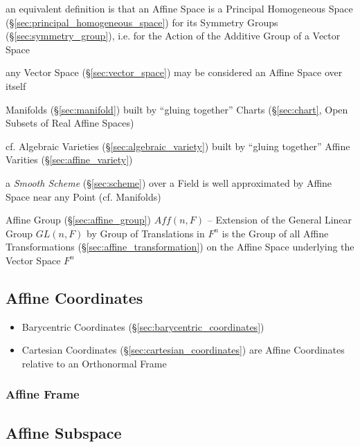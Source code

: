 an equivalent definition is that an Affine Space is a Principal Homogeneous
Space (\S\ref{sec:principal_homogeneous_space}) for its Symmetry Groups
(\S\ref{sec:symmetry_group}), i.e. for the Action of the Additive Group of a
Vector Space

any Vector Space (\S\ref{sec:vector_space}) may be considered an Affine Space
over itself

Manifolds (\S\ref{sec:manifold}) built by ``gluing together'' Charts
(\S\ref{sec:chart}, Open Subsets of Real Affine Spaces)

cf. Algebraic Varieties (\S\ref{sec:algebraic_variety}) built by ``gluing
together'' Affine Varities (\S\ref{sec:affine_variety})

\fist a \emph{Smooth Scheme} (\S\ref{sec:scheme}) over a Field is well
approximated by Affine Space near any Point (cf. Manifolds)

Affine Group (\S\ref{sec:affine_group}) $Aff(n,F)$ -- Extension of the General
Linear Group $GL(n,F)$ by Group of Translations in $F^n$ is the Group of all
Affine Transformations (\S\ref{sec:affine_transformation}) on the Affine Space
underlying the Vector Space $F^n$



\subsection{Affine Coordinates}\label{sec:affine_coordinates}

\begin{itemize}
  \item Barycentric Coordinates (\S\ref{sec:barycentric_coordinates})
  \item Cartesian Coordinates (\S\ref{sec:cartesian_coordinates}) are Affine
    Coordinates relative to an Orthonormal Frame
\end{itemize}



\subsubsection{Affine Frame}\label{sec:affine_frame}



\subsection{Affine Subspace}\label{sec:affine_subspace}


